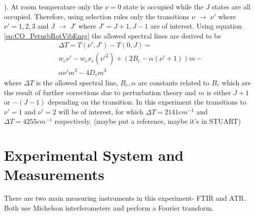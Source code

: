 \documentclass[reprint,amsmath,amssymb,aps, prl,superscriptaddress]{revtex4-2}
\begin{document}
). At room temperature only the $\nu=0$ state is occupied while the $J$ states are all occupied. Therefore, using selection rules \cite{griffithsQM} only the transitions $\nu$ $\rightarrow $ $\nu'$  where $\nu ' =1,2,3$  and $J$ $\rightarrow $ $J'$ where $J'=J+1,J-1$   are of interest. Using equation \ref{eq:CO_PeturbRotVibEnrg}
the allowed spectral lines are derived to be
\begin{equation} \label{eq:CO_DiffPeturbEnrg}
\begin{split}
& \Delta T =T(\nu ',J')-T(0,J)=\\
& w_{e}\nu' -w_{e}x_{e}(\nu'^{2})+(2B_{e}-\alpha(\nu'+1))m-\\
& \alpha\nu'm^2-4D_{v}m^{3}
\end{split}
\end{equation}
where $\Delta T$ is the allowed spectral line, $B_{e},\alpha $ are constants related to $B_{v}$  which are the result of further corrections due to perturbation theory and $m$ is either $J+1$ or $-(J-1)$  depending on the transition. In this experiment the transitions to $\nu'=1$ and $\nu' =2$ will be of interest, for which $\Delta T=2141cm^{-1}$ and $\Delta T = 4255 cm^{-1}$ respectively. (maybe put a reference, maybe it's in STUART)


\section{Experimental System and Measurements}
There are two main measuring instruments in this experiment- FTIR and ATR. Both use Michelson interferometers and perform a Fourier transform.
\end{document}
